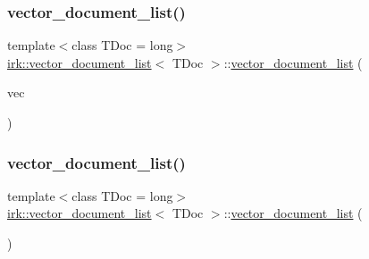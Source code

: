 \mbox{\label{classirk_1_1vector__document__list_aee7fc8d2b55075dca80eb883fe5cd0dc}} 
\subsubsection{\texorpdfstring{vector\+\_\+document\+\_\+list()}{vector\_document\_list()}\hspace{0.1cm}{\footnotesize\ttfamily [2/4]}}
{\footnotesize\ttfamily template$<$class T\+Doc  = long$>$ \\
\mbox{\hyperlink{classirk_1_1vector__document__list}{irk\+::vector\+\_\+document\+\_\+list}}$<$ T\+Doc $>$\+::\mbox{\hyperlink{classirk_1_1vector__document__list}{vector\+\_\+document\+\_\+list}} (\begin{DoxyParamCaption}\item[{std\+::vector$<$ \mbox{\hyperlink{classirk_1_1vector__document__list_a0ec9c56f5e12a3a9101b5a18b2fbe69f}{value\+\_\+type}} $>$}]{vec }\end{DoxyParamCaption})\hspace{0.3cm}{\ttfamily [inline]}}

\mbox{\label{classirk_1_1vector__document__list_a9cf59196d2d41f1c83d018aa8891cb80}} 
\subsubsection{\texorpdfstring{vector\+\_\+document\+\_\+list()}{vector\_document\_list()}\hspace{0.1cm}{\footnotesize\ttfamily [3/4]}}
{\footnotesize\ttfamily template$<$class T\+Doc  = long$>$ \\
\mbox{\hyperlink{classirk_1_1vector__document__list}{irk\+::vector\+\_\+document\+\_\+list}}$<$ T\+Doc $>$\+::\mbox{\hyperlink{classirk_1_1vector__document__list}{vector\+\_\+document\+\_\+list}} (\begin{DoxyParamCaption}\item[{const \mbox{\hyperlink{classirk_1_1vector__document__list}{vector\+\_\+document\+\_\+list}}$<$ T\+Doc $>$ \&}]{ }\end{DoxyParamCaption})\hspace{0.3cm}{\ttfamily [default]}}

